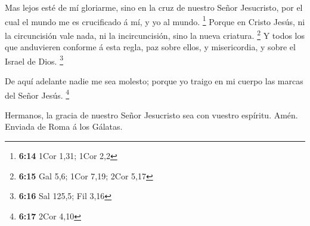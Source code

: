  Mas lejos esté de mí gloriarme, sino en la cruz de
nuestro Señor Jesucristo, por el cual el mundo me es crucificado á mí, y
yo al mundo. \footnote{\textbf{6:14} 1Cor 1,31; 1Cor 2,2}
 Porque en Cristo Jesús, ni la circuncisión vale nada, ni
la incircuncisión, sino la nueva criatura. \footnote{\textbf{6:15} Gal
  5,6; 1Cor 7,19; 2Cor 5,17}  Y todos los que anduvieren
conforme á esta regla, paz sobre ellos, y misericordia, y sobre el
Israel de Dios. \footnote{\textbf{6:16} Sal 125,5; Fil 3,16}

 De aquí adelante nadie me sea molesto; porque yo traigo
en mi cuerpo las marcas del Señor Jesús. \footnote{\textbf{6:17} 2Cor
  4,10}

 Hermanos, la gracia de nuestro Señor Jesucristo sea con
vuestro espíritu. Amén. Enviada de Roma á los Gálatas.
